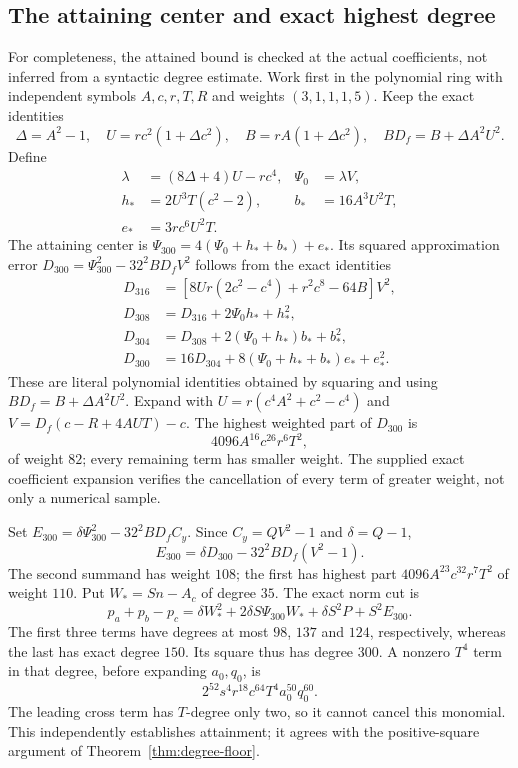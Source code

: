 \subsection{The attaining center and exact highest degree}
For completeness, the attained bound is checked at the actual coefficients,
not inferred from a syntactic degree estimate. Work first in the polynomial
ring with independent symbols $A,c,r,T,R$ and weights $(3,1,1,1,5)$.
Keep the exact identities
\[
 \Delta=A^2-1,\quad U=rc^2(1+\Delta c^2),\quad
 B=rA(1+\Delta c^2),\quad BD_f=B+\Delta A^2U^2.
\]
Define
\begin{align*}
 \lambda&=(8\Delta+4)U-rc^4,&\Psi_0&=\lambda V,\\
 h_*&=2U^3T(c^2-2),&b_*&=16A^3U^2T,\\
 e_*&=3rc^6U^2T.
\end{align*}
The attaining center is $\Psi_{300}=4(\Psi_0+h_*+b_*)+e_*$.
Its squared approximation error
$D_{300}=\Psi_{300}^2-32^2BD_fV^2$ follows from the exact identities
\begin{align*}
 D_{316}&=[8Ur(2c^2-c^4)+r^2c^8-64B]V^2,\\
 D_{308}&=D_{316}+2\Psi_0h_*+h_*^2,\\
 D_{304}&=D_{308}+2(\Psi_0+h_*)b_*+b_*^2,\\
 D_{300}&=16D_{304}+8(\Psi_0+h_*+b_*)e_*+e_*^2.
\end{align*}
These are literal polynomial identities obtained by squaring and using
$BD_f=B+\Delta A^2U^2$. Expand with
$U=r(c^4A^2+c^2-c^4)$ and
$V=D_f(c-R+4AUT)-c$. The highest weighted part of $D_{300}$ is
\[
 4096A^{16}c^{26}r^6T^2,
\]
of weight $82$; every remaining term has smaller weight. The supplied exact
coefficient expansion verifies the cancellation of every term of greater
weight, not only a numerical sample.

Set $E_{300}=\delta\Psi_{300}^2-32^2BD_fC_y$. Since $C_y=QV^2-1$ and
$\delta=Q-1$,
\[
 E_{300}=\delta D_{300}-32^2BD_f(V^2-1).
\]
The second summand has weight $108$; the first has highest part
$4096A^{23}c^{32}r^7T^2$ of weight $110$. Put $W_*=Sn-A_c$ of degree
$35$. The exact norm cut is
\[
 p_a+p_b-p_c=\delta W_*^2+2\delta S\Psi_{300}W_*
             +\delta S^2P+S^2E_{300}.
\]
The first three terms have degrees at most $98$, $137$ and $124$,
respectively, whereas the last has exact degree $150$. Its square thus has
degree $300$. A nonzero $T^4$ term in that degree, before expanding $a_0,q_0$,
is
\[
 2^{52}s^4r^{18}c^{64}T^4a_0^{50}q_0^{60}.
\]
The leading cross term has $T$-degree only two, so it cannot cancel this
monomial. This independently establishes attainment; it agrees with the
positive-square argument of Theorem~\ref{thm:degree-floor}.


